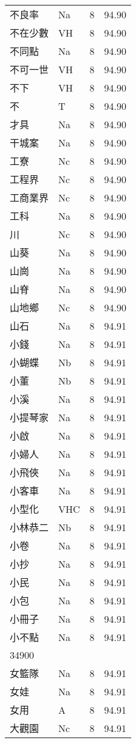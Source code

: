 \documentclass[twocolumn]{book}
\begin{document}
\begin{supertabular}{llrr}
不良率 & Na & 8 &  94.90\\
不在少數 & VH & 8 &  94.90\\
不同點 & Na & 8 &  94.90\\
不可一世 & VH & 8 &  94.90\\
不下 & VH & 8 &  94.90\\
不 & T & 8 &  94.90\\
才具 & Na & 8 &  94.90\\
干城案 & Na & 8 &  94.90\\
工寮 & Nc & 8 &  94.90\\
工程界 & Nc & 8 &  94.90\\
工商業界 & Nc & 8 &  94.90\\
工科 & Na & 8 &  94.90\\
川 & Nc & 8 &  94.90\\
山葵 & Na & 8 &  94.90\\
山崗 & Na & 8 &  94.90\\
山脊 & Na & 8 &  94.90\\
山地鄉 & Nc & 8 &  94.90\\
山石 & Na & 8 &  94.91\\
小錢 & Na & 8 &  94.91\\
小蝴蝶 & Nb & 8 &  94.91\\
小董 & Nb & 8 &  94.91\\
小溪 & Na & 8 &  94.91\\
小提琴家 & Na & 8 &  94.91\\
小啟 & Na & 8 &  94.91\\
小婦人 & Na & 8 &  94.91\\
小飛俠 & Na & 8 &  94.91\\
小客車 & Na & 8 &  94.91\\
小型化 & VHC & 8 &  94.91\\
小林恭二 & Nb & 8 &  94.91\\
小卷 & Na & 8 &  94.91\\
小抄 & Na & 8 &  94.91\\
小民 & Na & 8 &  94.91\\
小包 & Na & 8 &  94.91\\
小冊子 & Na & 8 &  94.91\\
小不點 & Na & 8 &  94.91\\
34900\\
女籃隊 & Na & 8 &  94.91\\
女娃 & Na & 8 &  94.91\\
女用 & A & 8 &  94.91\\
大觀園 & Nc & 8 &  94.91\\

\end{supertabular}
\end{document}
